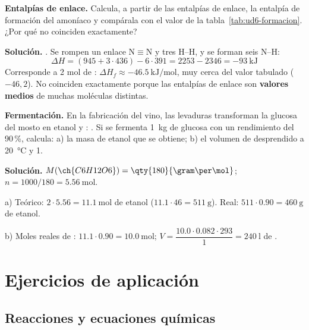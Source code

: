 \begin{example}
    \textbf{Entalpías de enlace.} Calcula, a partir de las entalpías de enlace, la entalpía de formación del amoníaco y compárala
    con el valor de la tabla~\ref{tab:ud6-formacion}. ¿Por qué no coinciden exactamente?

    \textbf{Solución.} . Se rompen un enlace \(\mathrm{N{\equiv}N}\) y tres H--H, y se forman
    seis N--H:
    \[ \Delta H = (945 + 3 \cdot 436) - 6 \cdot 391 = 2253 - 2346 = \qty{-93}{\kilo\joule} \]
    Corresponde a 2 mol de : \(\Delta H_f \approx \qty{-46.5}{\kilo\joule\per\mol}\), muy cerca del valor tabulado
    (\(-46{,}2\)). No coinciden exactamente porque las entalpías de enlace son \textbf{valores medios} de muchas moléculas distintas.
\end{example}

\begin{example}
    \textbf{Fermentación.} En la fabricación del vino, las levaduras transforman la glucosa del mosto en etanol y :
    . Si se fermenta \qty{1}{\kilo\gram} de glucosa con un rendimiento del 90\,\%, calcula:
    a) la masa de etanol que se obtiene; b) el volumen de  desprendido a \qty{20}{\degreeCelsius} y \qty{1}{\atm}.

    \textbf{Solución.} \(M(\ch{C6H12O6}) = \qty{180}{\gram\per\mol}\); \(n = 1000/180 = \qty{5.56}{\mol}\).

    a) Teórico: \(2 \cdot \num{5.56} = \qty{11.1}{\mol}\) de etanol (\(\num{11.1} \cdot 46 = \qty{511}{\gram}\)). Real:
    \(511 \cdot \num{0.90} = \qty{460}{\gram}\) de etanol.

    b) Moles reales de : \(\num{11.1} \cdot \num{0.90} = \qty{10.0}{\mol}\); \(V = \dfrac{\num{10.0} \cdot \num{0.082} \cdot 293}{1} =
    \qty{240}{\litre}\) de .
\end{example}

\section{Ejercicios de aplicación}\label{sec:ud6-aplicacion}

\subsection{Reacciones y ecuaciones químicas}


